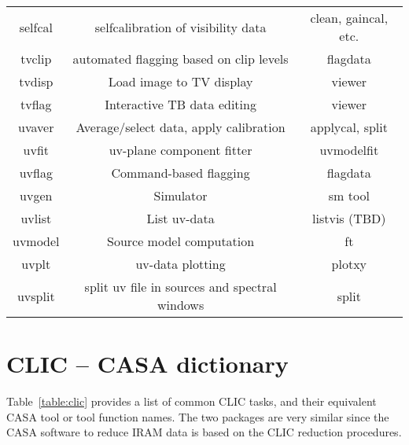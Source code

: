 \begin{table}[ht]
\begin{center}
\begin{tabular}{|c|c|c|}
  selfcal &  selfcalibration of visibility data  & clean, gaincal, etc. \\
  tvclip  &  automated flagging based on clip levels  & flagdata \\
  tvdisp  &  Load image to TV display      &  viewer  \\
  tvflag  &  Interactive TB data editing   &  viewer  \\
  uvaver  &  Average/select data, apply calibration  &  applycal, split  \\
  uvfit   &  uv-plane component fitter     &  uvmodelfit  \\
  uvflag  &  Command-based flagging        &  flagdata  \\
  uvgen   &  Simulator                     &  sm tool \\
  uvlist  &  List uv-data                  &  listvis (TBD) \\
  uvmodel &  Source model computation      &  ft \\
  uvplt   &  uv-data plotting              &  plotxy \\
  uvsplit &  split uv file in sources and spectral windows &  split  \\
\hline
\end{tabular}
\end{center}
\end{table}


\section{CLIC -- CASA dictionary}
\label{section:dict.clic}

Table~\ref{table:clic} provides a list of common CLIC tasks, and their
equivalent CASA tool or tool function names. The two packages are
very similar since the CASA software to reduce IRAM data is based
on the CLIC reduction procedures.

